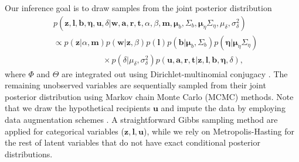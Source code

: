 \documentclass[twoside]{article}
\begin{document}
Our inference goal is to draw samples from the joint posterior distribution
  \begin{equation*}
  \begin{aligned}
  &p(\boldsymbol{z},\boldsymbol{l},\boldsymbol{b}, \boldsymbol{\eta}, \boldsymbol{u}, \delta|\boldsymbol{w}, \boldsymbol{a}, \boldsymbol{r}, \boldsymbol{t}, \alpha, \beta, \boldsymbol{m}, \boldsymbol{\mu}_b, \Sigma_b, \boldsymbol{\mu}_\eta \Sigma_\eta, {\mu}_\delta,\sigma^2_\delta)\\
  & \propto p(\boldsymbol{z}|\alpha, \boldsymbol{m})p(\boldsymbol{w}|\boldsymbol{z}, \beta)p(\boldsymbol{l})p(\boldsymbol{b}|\boldsymbol{\mu}_b, \Sigma_b)p( \boldsymbol{\eta}|\boldsymbol{\mu}_\eta \Sigma_\eta)\\
  & \quad\quad\quad\quad\quad\quad\times p(\delta| {\mu}_\delta,\sigma^2_\delta)p(\boldsymbol{u}, \boldsymbol{a}, \boldsymbol{r}, \boldsymbol{t}|\boldsymbol{z},\boldsymbol{l}, \boldsymbol{b}, \boldsymbol{\eta}, \delta),
  \end{aligned}
  \label{eqn:jointposterior}
  \end{equation*}
  where $\Phi$ and $\Theta$ are integrated out using Dirichlet-multinomial conjugacy \citep{griffiths2004finding}. The remaining unobserved variables are sequentially sampled from their joint posterior distribution using Markov chain Monte Carlo (MCMC) methods. Note that we draw the hypothetical recipients $\boldsymbol{u}$ and impute the data by employing data augmentation schemes \citep{tanner1987calculation}. A straightforward Gibbs sampling method are applied for categorical variables ($\boldsymbol{z},\boldsymbol{l},\boldsymbol{u}$), while we rely on Metropolis-Hasting for the rest of latent variables that do not have exact conditional posterior distributions.
  
\end{document}
